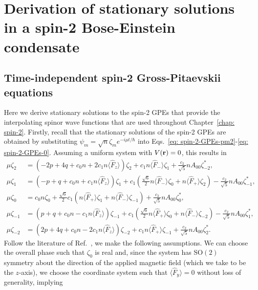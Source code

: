 \chapter{Derivation of stationary solutions in a spin-2 Bose-Einstein
  condensate}\label{appendix: stationary}
\section{Time-independent spin-2 Gross-Pitaevskii equations}
Here we derive stationary solutions to the spin-2 GPEs that provide the
interpolating spinor wave functions that are used throughout
Chapter~\ref{chap: spin-2}.
Firstly, recall that the stationary solutions of the spin-2 GPEs are obtained by
substituting \(\psi_m = \sqrt{n}\zeta_m e^{-i\mu t/\hbar}\) into
Eqs.~\eqref{eq: spin-2-GPEs-pm2}-\eqref{eq: spin-2-GPEs-0}.
Assuming a uniform system with \(V(\vb{r}) = 0\), this results in
\begin{align}
    \mu\zeta_2 & = \left(-2p + 4q + c_0n
    + 2c_1n\langle\hat{F}_z\rangle\right)\zeta_2
    + c_1n\langle\hat{F}_-\rangle\zeta_1
    + \frac{c_2}{\sqrt{5}}nA_{00}\zeta^*_{-2}, \\
    \mu\zeta_1 & = \left(-p + q + c_0n
    + c_1n\langle\hat{F}_z\rangle\right)\zeta_1
    + c_1\left(\frac{\sqrt{6}}{2}n\langle\hat{F}_-\rangle\zeta_0
    +n\langle\hat{F}_+\rangle\zeta_2\right)
    - \frac{c_2}{\sqrt{5}}nA_{00}\zeta^*_{-1}, \\
    \mu\zeta_0 & = c_0n\zeta_0 + \frac{\sqrt{6}}{2}c_1\left(
        n\langle\hat{F}_+\rangle\zeta_1 + n\langle\hat{F}_-\rangle\zeta_{-1}
    \right) + \frac{c_2}{\sqrt{5}}nA_{00}\zeta_0^*,        \\
    \mu\zeta_{-1} & = \left(p + q + c_0n
    - c_1n\langle\hat{F}_z\rangle\right)\zeta_{-1}
    + c_1\left(\frac{\sqrt{6}}{2}n\langle\hat{F}_+\rangle\zeta_0
    +n\langle\hat{F}_-\rangle\zeta_{-2}\right)
    - \frac{c_2}{\sqrt{5}}nA_{00}\zeta^*_{1}, \\
    \mu\zeta_{-2} & = \left(2p + 4q + c_0n
    - 2c_1n\langle\hat{F}_z\rangle\right)\zeta_{-2}
    + c_1n\langle\hat{F}_+\rangle\zeta_{-1}
    + \frac{c_2}{\sqrt{5}}nA_{00}\zeta^*_{2}.
\end{align}
Follow the literature of Ref.~\cite{Kawaguchi2012}, we make the following
assumptions.
We can choose the overall phase such that \(\zeta_0\) is real and, since the
system has \(\text{SO}(2)\) symmetry about the direction of the applied magnetic
field (which we take to be the \(z\)-axis), we choose the coordinate system such
that \(\langle\hat{F}_y\rangle=0\) without loss of generality, implying
